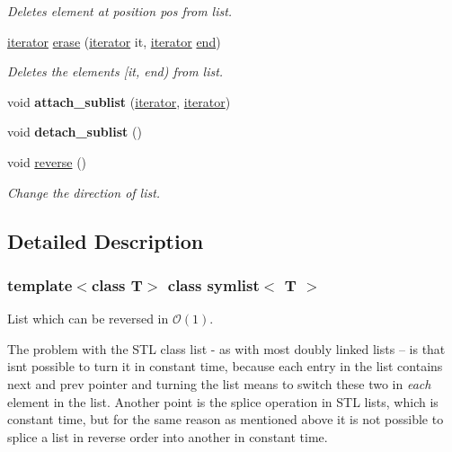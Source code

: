 \begin{DoxyCompactItemize}
\begin{DoxyCompactList}\small\item\em Deletes element at position {\ttfamily pos} from list. \end{DoxyCompactList}\item 
\mbox{\hyperlink{structsymlist__iterator}{iterator}} \mbox{\hyperlink{classsymlist_a53128defa9aedb016affcfa27bf201da}{erase}} (\mbox{\hyperlink{structsymlist__iterator}{iterator}} it, \mbox{\hyperlink{structsymlist__iterator}{iterator}} \mbox{\hyperlink{classsymlist_a7283589fa01f79d722f8256d7a6a7883}{end}})
\begin{DoxyCompactList}\small\item\em Deletes the elements {\ttfamily \mbox{[}it, end)} from list. \end{DoxyCompactList}\item 
\mbox{\label{classsymlist_a526206a1d6fd2f2cef9f73ec499b6315}} 
void {\bfseries attach\+\_\+sublist} (\mbox{\hyperlink{structsymlist__iterator}{iterator}}, \mbox{\hyperlink{structsymlist__iterator}{iterator}})
\item 
\mbox{\label{classsymlist_a784f81bf9dfbfc1865f188a82681779f}} 
void {\bfseries detach\+\_\+sublist} ()
\item 
void \mbox{\hyperlink{classsymlist_ae22b65101604c694e96974cc9579ab78}{reverse}} ()
\begin{DoxyCompactList}\small\item\em Change the direction of list. \end{DoxyCompactList}\end{DoxyCompactItemize}


\subsection{Detailed Description}
\subsubsection*{template$<$class T$>$\newline
class symlist$<$ T $>$}

List which can be reversed in $\mathcal{O}(1)$. 

The problem with the S\+TL class list -\/ as with most doubly linked lists -- is that isn\textquotesingle{}t possible to turn it in constant time, because each entry in the list contains next and prev pointer and turning the list means to switch these two in {\itshape each} element in the list. Another point is the splice operation in S\+TL lists, which is constant time, but for the same reason as mentioned above it is not possible to splice a list in reverse order into another in constant time. 

